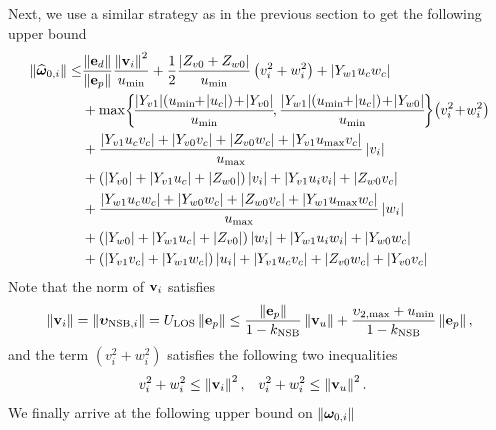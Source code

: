 Next, we use a similar strategy as in the previous section to get the following upper bound
\begin{align}
    \norm{\widehat{\bs{\omega}}_{0, i}} \leq &
    \frac{\norm{\mat{e}_d}}{\norm{\mat{e}_p}}\frac{\norm{\mat{v}_i}^2}{u_{\rm min}} + \frac{1}{2}\frac{\abs{Z_{v0} + Z_{w0}}}{u_{\min}}\left(v_i^2 + w_i^2\right)
    + \abs{Y_{w1}u_cw_c} \nonumber \\
    &+ \max\!\left\{\!\frac{\abs{Y_{v1}}\!\left(u_{\min\!}\!+\!\abs{u_c}\right)\! + \!\abs{Y_{v0}}}{u_{\min}}\!, \frac{\abs{Y_{w1}}\!\left(u_{\min\!}\!+\!\abs{u_c}\right)\! +\! \abs{Y_{w0}}}{u_{\min}}\!\right\}\!\left(v_i^2\! + \!w_i^2\right) \nonumber \\
    &+ \frac{\abs{Y_{v1}u_cv_c} + \abs{Y_{v0}v_c} + \abs{Z_{v0}w_c} + \abs{Y_{v1}u_{\max}v_c}}{u_{\max}}\abs{v_i} \nonumber \\
    & + \left(\abs{Y_{v0}} + \abs{Y_{v1}u_c} + \abs{Z_{w0}}\right)\abs{v_i} + \abs{Y_{v1}u_iv_i} + \abs{Z_{w0}v_c} \nonumber \\
    &+ \frac{\abs{Y_{w1}u_cw_c} + \abs{Y_{w0}w_c} + \abs{Z_{w0}v_c} + \abs{Y_{w1}u_{\max}w_c}}{u_{\max}}\abs{w_i} \nonumber \\
    & + \left(\abs{Y_{w0}} + \abs{Y_{w1}u_c} + \abs{Z_{v0}}\right)\abs{w_i} + \abs{Y_{w1}u_iw_i} + \abs{Y_{w0}w_c} \nonumber \\
    &+ \left(\abs{Y_{v1}v_c}+\abs{Y_{w1}w_c}\right)\abs{u_i} + \abs{Y_{v1}u_cv_c} + \abs{Z_{v0}w_c} + \abs{Y_{v0}v_c}
\end{align}
Note that the norm of $\mathbf{v}_i$ satisfies
\begin{equation}
    \left\|\mathbf{v}_i\right\| = \left\|\bm{\upsilon}_{{\rm NSB}, i}\right\| = U_{\rm LOS}\left\|\mathbf{e}_p\right\|
    \leq \frac{\left\|\mathbf{e}_p\right\|}{1 - k_{\rm NSB}}\left\|\mathbf{v}_u\right\| + \frac{\upsilon_{2, \max} + u_{\min}}{1 - k_{\rm NSB}}\left\|\mathbf{e}_p\right\|,
\end{equation}
and the term $\left(v_i^2+w_i^2\right)$ satisfies the following two inequalities
\begin{align}
    v_i^2+w_i^2 &\leq \left\|\mathbf{v}_i\right\|^2, &
    v_i^2+w_i^2 &\leq \left\|\mathbf{v}_u\right\|^2.
\end{align}
We finally arrive at the following upper bound on $\left\|\bm{\omega}_{0, i}\right\|$

